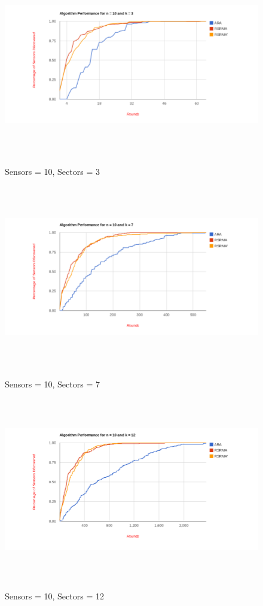 \begin{figure}[ht]
\caption{Sensors = 10, Sectors = 3}
\includegraphics[height = 8cm]{pics/graph10k3.png}\\[0.5cm]    
\label{fig:n10k3}
\end{figure}

\begin{figure}[ht]
\caption{Sensors = 10, Sectors = 7}
\includegraphics[height = 8cm]{pics/graph10k7.png}\\[0.5cm]   
\label{fig:n10k7} 
\end{figure}

\begin{figure}[ht]
\caption{Sensors = 10, Sectors = 12}
\includegraphics[height = 8cm]{pics/graph10k12.png}\\[0.5cm] 
\label{fig:n10k12}   
\end{figure}

